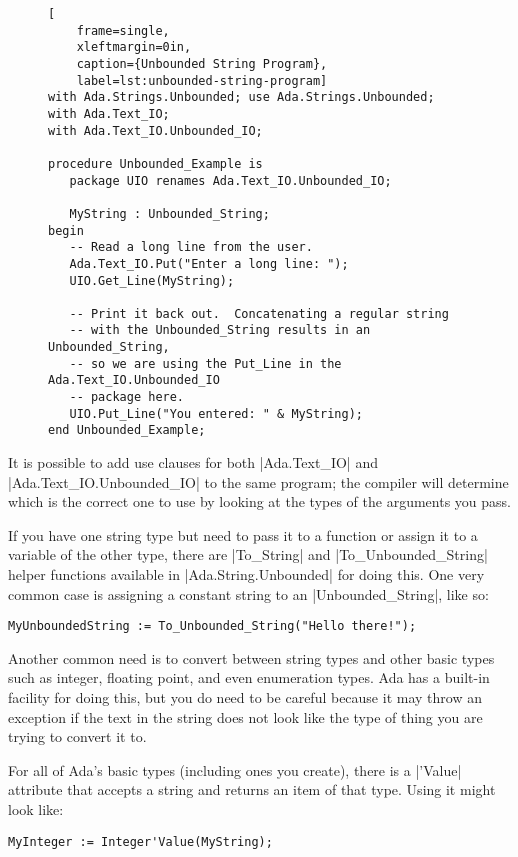 \begin{figure}[tbhp]
    \begin{lstlisting}[
    frame=single,
    xleftmargin=0in,
    caption={Unbounded String Program},
    label=lst:unbounded-string-program]
with Ada.Strings.Unbounded; use Ada.Strings.Unbounded;
with Ada.Text_IO;
with Ada.Text_IO.Unbounded_IO;

procedure Unbounded_Example is
   package UIO renames Ada.Text_IO.Unbounded_IO;

   MyString : Unbounded_String;
begin
   -- Read a long line from the user.
   Ada.Text_IO.Put("Enter a long line: ");
   UIO.Get_Line(MyString);

   -- Print it back out.  Concatenating a regular string
   -- with the Unbounded_String results in an Unbounded_String,
   -- so we are using the Put_Line in the Ada.Text_IO.Unbounded_IO
   -- package here.
   UIO.Put_Line("You entered: " & MyString);
end Unbounded_Example;
 \end{lstlisting}    
\end{figure}


It is possible to add use clauses for both |Ada.Text_IO| and |Ada.Text_IO.Unbounded_IO| to the
same program; the compiler will determine which is the correct one to use by looking at the
types of the arguments you pass.

If you have one string type but need to pass it to a function or assign it to a variable of the
other type, there are |To_String| and |To_Unbounded_String| helper functions available in
|Ada.String.Unbounded| for doing this. One very common case is assigning a constant string to an
|Unbounded_String|, like so:

\begin{lstlisting}
MyUnboundedString := To_Unbounded_String("Hello there!");
\end{lstlisting}

Another common need is to convert between string types and other basic types such as integer,
floating point, and even enumeration types. Ada has a built-in facility for doing this, but you
do need to be careful because it may throw an exception if the text in the string does not look
like the type of thing you are trying to convert it to.

For all of Ada's basic types (including ones you create), there is a |'Value| attribute that
accepts a string and returns an item of that type. Using it might look like:

\begin{lstlisting}
MyInteger := Integer'Value(MyString);
\end{lstlisting}

